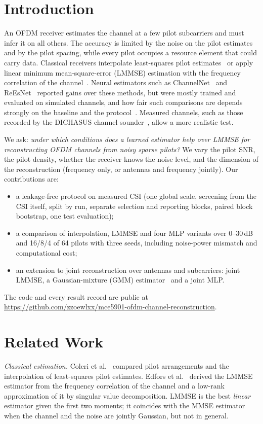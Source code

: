 \documentclass[conference]{IEEEtran}
\begin{document}
\section{Introduction}
An OFDM receiver estimates the channel at a few pilot subcarriers and must infer it on all others. The
accuracy is limited by the noise on the pilot estimates and by the pilot spacing, while every pilot
occupies a resource element that could carry data. Classical receivers interpolate least-squares pilot
estimates~\cite{coleri2002} or apply linear minimum mean-square-error (LMMSE) estimation with the
frequency correlation of the channel~\cite{edfors1998}. Neural estimators such as
ChannelNet~\cite{soltani2019} and ReEsNet~\cite{li2020} reported gains over these methods, but were mostly
trained and evaluated on simulated channels, and how fair such comparisons are depends strongly on the
baseline and the protocol~\cite{feriani2023}. Measured channels, such as those recorded by the DICHASUS
channel sounder~\cite{euchner2021sounder,euchner2021data}, allow a more realistic test.

We ask: \emph{under which conditions does a learned estimator help over LMMSE for reconstructing OFDM
channels from noisy sparse pilots?} We vary the pilot SNR, the pilot density, whether the receiver knows
the noise level, and the dimension of the reconstruction (frequency only, or antennas and frequency
jointly). Our contributions are:
\begin{itemize}
\item a leakage-free protocol on measured CSI (one global scale, screening from the CSI itself, split by
run, separate selection and reporting blocks, paired block bootstrap, one test evaluation);
\item a comparison of interpolation, LMMSE and four MLP variants over 0--30\,dB and 16/8/4 of 64 pilots
with three seeds, including noise-power mismatch and computational cost;
\item an extension to joint reconstruction over antennas and subcarriers: joint LMMSE, a Gaussian-mixture
(GMM) estimator~\cite{turan2022} and a joint MLP.
\end{itemize}
The code and every result record are public at \url{https://github.com/zzoewlxx/mce5901-ofdm-channel-reconstruction}.

\section{Related Work}
\emph{Classical estimation.} Coleri et al.~\cite{coleri2002} compared pilot arrangements and the
interpolation of least-squares pilot estimates. Edfors et al.~\cite{edfors1998} derived the LMMSE
estimator from the frequency correlation of the channel and a low-rank approximation of it by singular
value decomposition. LMMSE is the best \emph{linear} estimator given the first two moments; it coincides
with the MMSE estimator when the channel and the noise are jointly Gaussian, but not in general.
\end{document}
